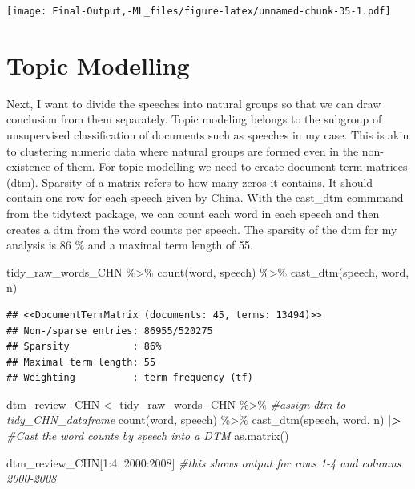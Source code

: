 \documentclass[
]{article}
\newenvironment{Shaded}{\begin{snugshade}}{\end{snugshade}}
\newcommand{\CommentTok}[1]{\textcolor[rgb]{0.56,0.35,0.01}{\textit{#1}}}
\newcommand{\DecValTok}[1]{\textcolor[rgb]{0.00,0.00,0.81}{#1}}
\newcommand{\ErrorTok}[1]{\textcolor[rgb]{0.64,0.00,0.00}{\textbf{#1}}}
\newcommand{\FunctionTok}[1]{\textcolor[rgb]{0.00,0.00,0.00}{#1}}
\newcommand{\NormalTok}[1]{#1}
\newcommand{\OtherTok}[1]{\textcolor[rgb]{0.56,0.35,0.01}{#1}}
\newcommand{\SpecialCharTok}[1]{\textcolor[rgb]{0.00,0.00,0.00}{#1}}
\begin{document}
\texttt{[image: Final-Output,-ML\_files/figure-latex/unnamed-chunk-35-1.pdf]}

\hypertarget{topic-modelling}{%
\section{Topic Modelling}\label{topic-modelling}}

Next, I want to divide the speeches into natural groups so that we can
draw conclusion from them separately. Topic modeling belongs to the
subgroup of unsupervised classification of documents such as speeches in
my case. This is akin to clustering numeric data where natural groups
are formed even in the non-existence of them. For topic modelling we
need to create document term matrices (dtm). Sparsity of a matrix refers
to how many zeros it contains. It should contain one row for each speech
given by China. With the cast\_dtm commmand from the tidytext package,
we can count each word in each speech and then creates a dtm from the
word counts per speech. The sparsity of the dtm for my analysis is 86 \%
and a maximal term length of 55.

\begin{Shaded}
\begin{Highlighting}[]
\NormalTok{tidy\_raw\_words\_CHN }\SpecialCharTok{\%\textgreater{}\%}   
  \FunctionTok{count}\NormalTok{(word, speech) }\SpecialCharTok{\%\textgreater{}\%}  
  \FunctionTok{cast\_dtm}\NormalTok{(speech, word, n)}
\end{Highlighting}
\end{Shaded}

\begin{verbatim}
## <<DocumentTermMatrix (documents: 45, terms: 13494)>>
## Non-/sparse entries: 86955/520275
## Sparsity           : 86%
## Maximal term length: 55
## Weighting          : term frequency (tf)
\end{verbatim}

\begin{Shaded}
\begin{Highlighting}[]
\NormalTok{dtm\_review\_CHN }\OtherTok{\textless{}{-}}\NormalTok{ tidy\_raw\_words\_CHN }\SpecialCharTok{\%\textgreater{}\%}   \CommentTok{\#assign dtm to tidy\_CHN\_dataframe}
  \FunctionTok{count}\NormalTok{(word, speech) }\SpecialCharTok{\%\textgreater{}\%}  
  \FunctionTok{cast\_dtm}\NormalTok{(speech, word, n) }\SpecialCharTok{|}\ErrorTok{\textgreater{}}    \CommentTok{\#Cast the word counts by speech into a DTM}
    \FunctionTok{as.matrix}\NormalTok{()}

\NormalTok{dtm\_review\_CHN[}\DecValTok{1}\SpecialCharTok{:}\DecValTok{4}\NormalTok{, }\DecValTok{2000}\SpecialCharTok{:}\DecValTok{2008}\NormalTok{] }\CommentTok{\#this shows output for rows 1{-}4 and columns 2000{-}2008}
\end{Highlighting}
\end{Shaded}
\end{document}
